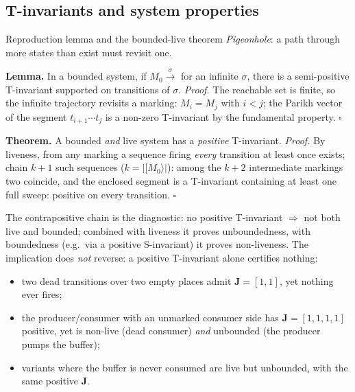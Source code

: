 \subsection{T-invariants and system properties}

\begin{notebox}{Reproduction lemma and the bounded-live theorem}
\emph{Pigeonhole}: a path through more states than exist must revisit one.
\par\smallskip
\textbf{Lemma.} In a bounded system, if $M_0 \xrightarrow{\sigma}$ for an infinite $\sigma$, there is a semi-positive T-invariant supported on transitions of $\sigma$.
\textit{Proof.} The reachable set is finite, so the infinite trajectory revisits a marking: $M_i = M_j$ with $i < j$; the Parikh vector of the segment $t_{i+1} \cdots t_j$ is a non-zero T-invariant by the fundamental property. \hfill$\square$
\par\smallskip
\textbf{Theorem.} A bounded \emph{and} live system has a \emph{positive} T-invariant.
\textit{Proof.} By liveness, from any marking a sequence firing \emph{every} transition at least once exists; chain $k + 1$ such sequences ($k = |[M_0\rangle|$): among the $k + 2$ intermediate markings two coincide, and the enclosed segment is a T-invariant containing at least one full sweep: positive on every transition. \hfill$\square$
\end{notebox}

The contrapositive chain is the diagnostic: no positive T-invariant $\Rightarrow$ not both live and bounded; combined with liveness it proves unboundedness, with boundedness (e.g.\ via a positive S-invariant) it proves non-liveness. The implication does \emph{not} reverse: a positive T-invariant alone certifies nothing:
\begin{itemize}
  \item two dead transitions over two empty places admit $\mathbf{J} = [1,1]$, yet nothing ever fires;
  \item the producer/consumer with an unmarked consumer side has $\mathbf{J} = [1,1,1,1]$ positive, yet is non-live (dead consumer) \emph{and} unbounded (the producer pumps the buffer);
  \item variants where the buffer is never consumed are live but unbounded, with the same positive $\mathbf{J}$.
\end{itemize}

